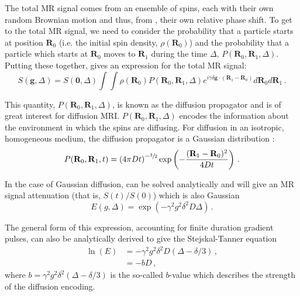 The total MR signal comes from an ensemble of spins, each with their own random Brownian motion and thus, from , their own relative phase shift.
To get to the total MR signal, we need to consider the probability that a particle starts at position $\mathbf{R}_0$ (i.e. the initial spin density, $\rho(\mathbf{R}_0)$) and the probability that a particle which starts at $\mathbf{R}_0$ moves to $\mathbf{R}_1$ during the time $\Delta$, $P(\mathbf{R}_0, \mathbf{R}_1, \Delta)$.
Putting these together, gives an expression for the total MR signal\cite{Price1997,Stejskal1965}:
\begin{equation}
  S(\mathbf{g}, \Delta) = S(\mathbf{0}, \Delta)\int\int \rho(\mathbf{R}_0)P(\mathbf{R}_0, \mathbf{R}_1, \Delta) e^{i\gamma\delta\mathbf{g} \cdot (\mathbf{R}_1 - \mathbf{R}_0)}  d\mathbf{R}_0d\mathbf{R}_1\,.
  \label{eq:total_signal_sgp}
\end{equation}

This quantity, $P(\mathbf{R}_0, \mathbf{R}_1, \Delta)$, is known as the diffusion propagator and is of great interest for diffusion MRI.
$P(\mathbf{R}_0, \mathbf{R}_1, \Delta)$ encodes the information about the environment in which the spins are diffusing. 
For diffusion in an isotropic, homogeneous medium, the diffusion propagator is a Gaussian distribution \cite{Price1997}:
\begin{equation}
  P(\mathbf{R}_0, \mathbf{R}_1, t) = \left(4\pi Dt\right)^{-\sfrac{3}{2}}\exp\left(-\frac{(\mathbf{R}_1 - \mathbf{R}_0)^2}{4Dt}\right)\,.
  \label{eq:propagator_diffusion}
\end{equation}

In the case of Gaussian diffusion,  can be solved analytically and will give an MR signal attenuation (that is, $S(t)/S(0)$) which is also Gaussian\cite{Stejskal1965,Price1997}
\begin{equation}
  E(g, \Delta) = \exp(-\gamma^2g^2\delta^2D\Delta)\,.
  \label{eq:sgp_signal_gaussian}
\end{equation}

The general form of this expression, accounting for finite duration gradient pulses, can also be analytically derived to give the Stejskal-Tanner equation \cite{Stejskal1965,Kuchel2012}
\begin{align}
  \ln(E) &= -\gamma^2g^2\delta^2D(\Delta - \delta/3)\,,\label{eq:stejskal_tanner}\\
  &= -bD\,,
\end{align}
where $b = \gamma^2g^2\delta^2(\Delta - \delta/3)$ is the so-called $b$-value which describes the strength of the diffusion encoding. 

